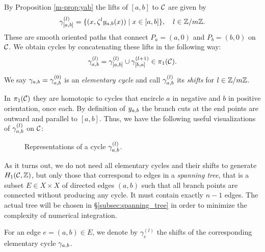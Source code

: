 \documentclass[main.tex]{subfiles}
\begin{document}
   By Proposition \ref{m-prop:yab} the lifts of $[a,b]$ to $\mathcal{C}$ are given by
   \begin{equation}\label{eq:def_path_ab}
      \gamma^{(l)}_{[a,b]} = \{  (x,\zeta^l y_{a,b}(x))  \mid  x \in [a,b]  \}, \quad l \in \mathbb{Z}/m\mathbb{Z}.
   \end{equation}
   These are smooth oriented paths that connect $P_a = (a,0)$ and $P_b = (b,0)$ on $\mathcal{C}$. We obtain cycles by concatenating these lifts in the following way:
    \begin{equation}\label{eq:def_cyabl}
      \gamma_{a,b}^{(l)} = \gamma^{(l)}_{[a,b]} \cup \gamma^{(l+1)}_{[b,a]} \in \pi_1(\mathcal{C}).
   \end{equation}
   \begin{defn}\label{def:elem_cycles}
       We say $\gamma_{a,b} = \gamma_{a,b}^{(0)}$ is an \emph{elementary cycle} and call $\gamma_{a,b}^{(l)}$ its \emph{shifts} for $l \in \mathbb{Z}/m\mathbb{Z}$.
   \end{defn}
   In $\pi_1(\mathcal{C})$
   they are homotopic to cycles that encircle  $a$ in negative and $b$ in positive orientation, once each.
   By definition of $y_{a,b}$ the branch cuts at the end points are outward and parallel to $[a,b]$. Thus, we have the following useful visualizations of $\gamma_{a,b}^{(l)}$ on $\mathcal{C}$:
   \begin{figure}[H]
      \begin{center}
   
      \end{center}
    \caption{Representations of a cycle $\gamma_{a,b}^{(l)}$.}
    \label{fig:elem_cycle}
\end{figure}

  \bigskip

  As it turns out, we do not need all elementary cycles and their shifts to
  generate $H_1(\mathcal{C},\mathbb{Z})$, but only those that correspond to edges in a \emph{spanning tree},
  that is a subset $E\in X\times X$ of directed edges $(a,b)$ such that all branch points
  are connected without producing any cycle. It must contain exactly $n-1$ edges.
  The actual tree will be chosen in \S \ref{subsec:spanning_tree} in order to minimize
  the complexity of numerical integration.
  
    \medskip
  For an edge $e = (a,b) \in E$, we denote by $\gamma_e^{(l)}$ the shifts of
  the corresponding elementary cycle $\gamma_{a,b}$.
  
\end{document}
